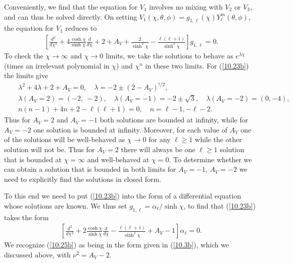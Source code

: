 \documentclass[aps,onecolumn,10pt]{revtex4}
\numberwithin{equation}{section}
\numberwithin{equation}{section}
\begin{document}
Conveniently, we find that the equation for $V_1$ involves no mixing with $V_2$ or $V_3$, and can thus be solved directly. On setting $V_1(\chi,\theta,\phi)=g_{1,\ell}(\chi)Y_{\ell}^m(\theta,\phi)$, the equation for $V_1$ reduces to 
%
\begin{eqnarray}
\left[\frac{d^2}{d\chi^2}+4\frac{\cosh\chi}{ \sinh\chi}\frac{d }{d\chi}
+2+A_V+\frac{2 }{ \sinh^2\chi}-\frac{\ell(\ell+1)}{ \sinh^2\chi}\right]g_{1,\ell}=0.
\label{10.23b}
\end{eqnarray}
%
To check the $\chi \rightarrow \infty$ and $\chi \rightarrow 0$ limits, we take the solutions to behave as $e^{\lambda\chi}$ (times an irrelevant polynomial in $\chi$) and $\chi^n$ in these two limits. For (\ref{10.23b}) the limits give
%
\begin{eqnarray}
&&\lambda^2+4\lambda+2+A_V=0,\quad\lambda=-2\pm (2-A_V)^{!/2},
\nonumber\\
&&\lambda(A_V=2)=(-2,~-2),\quad \lambda(A_V=-1)=-2\pm \surd{3},\quad \lambda(A_V=-2)=(0,-4),
\nonumber\\
&&n(n-1)+4n+2-\ell(\ell+1)=0,\quad n=\ell-1, -\ell-2.
\label{10.24b}
\end{eqnarray}
%
Thus for $A_V=2$ and $A_V=-1$ both solutions are bounded at infinity, while for $A_V=-2$ one solution is bounded at infinity. Moreover, for each value of $A_V$ one of the solutions will  be well-behaved as $\chi\rightarrow 0$ for any $\ell\geq 1$ while the other solution will not be.  Thus for $A_V=2$ there will always be one $\ell\geq 1$ solution that is bounded at $\chi=\infty$ and well-behaved at $\chi=0$. To determine whether we can obtain a solution that is bounded in both limits for $A_V=-1$, $A_V=-2$ we need to explicitly find the solutions in closed form. 


To this end we need to put (\ref{10.23b})  into the form of a differential equation whose solutions are known. We thus set $g_{1,\ell}=\alpha_{\ell}/\sinh\chi$, to find that (\ref{10.23b}) takes the form
%
\begin{eqnarray}
\left[\frac{d^2 }{d\chi^2}+2\frac{\cosh\chi}{ \sinh\chi}\frac{d }{d\chi}
-\frac{\ell(\ell+1) }{\sinh^2\chi}+A_V-1\right]\alpha_{\ell}=0.
\label{10.25b}
\end{eqnarray}
%
We recognize (\ref{10.25b}) as being in the form given in  (\ref{10.3b}), which we discussed above, with $\nu^2=A_V-2$.
\end{document}
